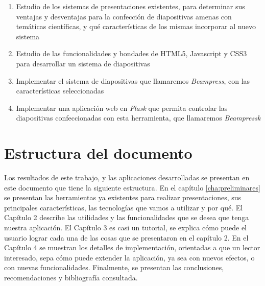\begin{introduction}
		\begin{enumerate}
			\item Estudio de los sistemas de presentaciones existentes, para determinar sus ventajas y desventajas para la confección de diapositivas amenas con temáticas científicas, y qué características de los mismas incorporar al nuevo sistema
			\item Estudio de las funcionalidades y bondades de HTML5, Javascript y CSS3 para desarrollar un sistema de diapositivas
			\item Implementar el sistema de diapositivas que llamaremos \textit{Beampress}, con las características seleccionadas
			\item Implementar una aplicación web en \textit{Flask} que permita controlar las diapositivas confeccionadas con esta herramienta, que llamaremos \textit{Beampressk}
		\end{enumerate}

	\section*{Estructura del documento}
	
		Los resultados de este trabajo, y las aplicaciones desarrolladas se presentan en este documento que tiene la siguiente estructura. En el capítulo \ref{cha:preliminares} se presentan las herramientas ya existentes para realizar presentaciones, sus principales características, las tecnologías que vamos a utilizar y por qué. El Capítulo 2 describe las utilidades y las funcionalidades que se desea que tenga nuestra aplicación. El Capítulo 3 es casi un tutorial, se explica cómo puede el usuario lograr cada una de las cosas que se presentaron en el capítulo 2. En el Capítulo 4 se muestran los detalles de implementación, orientadas a que un lector interesado, sepa cómo puede extender la aplicación, ya sea con nuevos efectos, o con nuevas funcionalidades. Finalmente, se presentan las conclusiones, recomendaciones y bibliografía consultada.






\end{introduction}




